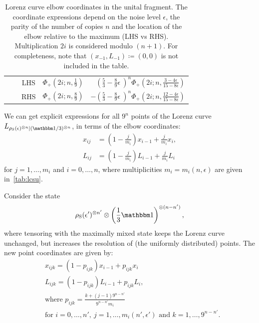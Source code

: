 \begin{table}[h]
\begin{tabular}{c|c|c|r|r}
    & \multirow{2}{*}{\raisebox{-3ex}{\rotatebox[origin=c]{90}{$n$ odd}}} & LHS & $\Phi_+\left(2i;n,\frac{1}{9}\right)$ & $\left( \frac{5}{3} - \frac{8}{9}\epsilon\ \right)^n \Phi_+\left(2i;n,\frac{3-4\epsilon}{15-8\epsilon}\right)$ \\
    & & RHS & $\Phi_+\left(2i;n,\frac{8}{9}\right)$ & $- \left( \frac{5}{3} - \frac{8}{9}\epsilon\ \right)^n\Phi_+\left(2i;n,\frac{12-4\epsilon}{15-8\epsilon}\right)$ \\ \hline
  \end{tabular}
  \caption{Lorenz curve elbow coordinates in the unital fragment.
  The coordinate expressions depend on the noise level $\epsilon$, the parity of the number of copies $n$ and the location of the elbow relative to the maximum (LHS vs RHS).
  Multiplication $2i$ is considered modulo $(n+1)$.
  For completeness, note that $(x_{-1}, L_{-1}) \coloneqq (0,0)$ is not included in the table.
  }
  \label{tab:lcsu_coord_elb_app}
\end{table}

We can get explicit expressions for all $9^{n}$ points of the Lorenz curve $\lc{\rho_{\rm{S}}(\epsilon)^{\otimes n}}{(\id/3)^{\otimes n}}$, in terms of the elbow coordinates:
\begin{align}
    x_{ij} &= \left( 1-\frac{j}{m_{i}} \right) x_{i-1} + \frac{j}{m_{i}} x_{i}, \label{eq:x}\\
    L_{ij} &= \left( 1-\frac{j}{m_{i}} \right) L_{i-1} + \frac{j}{m_{i}} L_{i} \label{eq:l}
\end{align}
for $j = 1,\dots,m_{i}$ and $i=0,\dots,n$, where multiplicities $m_i = m_i(n, \epsilon)$ are given in~\cref{tab:lcsu}.

Consider the state 
\begin{equation*}
\rho_{\rm{S}}(\epsilon')^{\otimes n'} \otimes \left( \frac{1}{3}\id \right)^{\otimes (n-n')},
\end{equation*}
where tensoring with the maximally mixed state keeps the Lorenz curve unchanged, but increases the resolution of (the uniformly distributed) points.
The new point coordinates are given by:
\begin{align}
    &x_{ijk} = \left( 1-p_{ijk}\right) x_{i-1} + p_{ijk} x_{i} \label{eq:lcsu_xcoord}\\
    &L_{ijk} = \left( 1-p_{ijk} \right) L_{i-1} + p_{ijk} L_{i}, \label{eq:lcsu_lcoord}\\
    &\text{where } p_{ijk} = \frac{k + (j-1)9^{n-n'}}{9^{n-n'} m_{i}} \nonumber\\
    &\text{for } i=0,\dots,n',\ j = 1,\dots,m_{i}(n', \epsilon') \text{ and } k = 1,\dots,9^{n-n'}. \nonumber
\end{align}

